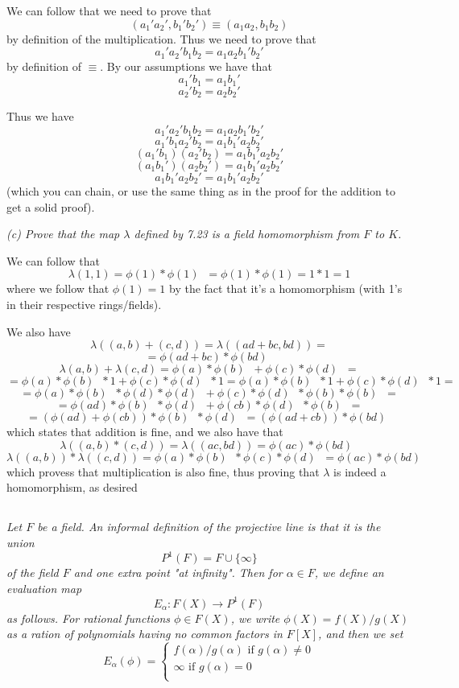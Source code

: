 \documentclass[11pt,oneside,titlepage]{book}
\DeclareMathOperator \inv {^{-1}}
\newcommand{\set}[1]{\{ #1 \}}
\begin{document}
We can follow that we need to prove that
$$(a_1' a_2', b_1' b_2') \equiv (a_1 a_2, b_1 b_2)$$
by definition of the multiplication. Thus we need to prove that
$$a_1' a_2'b_1 b_2 = a_1 a_2 b_1' b_2'$$
by definition of $\equiv$. By our assumptions we have that
$$a_1' b_1 = a_1 b_1'$$
$$a_2' b_2 = a_2 b_2'$$

Thus we have
$$a_1' a_2'b_1 b_2 = a_1 a_2 b_1' b_2'$$
$$a_1' b_1 a_2' b_2  = a_1 b_1' a_2 b_2'$$
$$(a_1' b_1) (a_2' b_2)  = a_1 b_1' a_2 b_2'$$
$$(a_1 b_1') (a_2 b_2')  = a_1 b_1' a_2 b_2'$$
$$a_1 b_1' a_2 b_2'  = a_1 b_1' a_2 b_2'$$
(which you can chain, or use the same thing as in the proof for the
addition to get a solid proof).

\textit{(c) Prove that the map $\lambda$ defined by 7.23 is a field
  homomorphism from $F$ to $K$.}

We can follow that
$$\lambda(1, 1) = \phi(1) * \phi(1)\inv = \phi(1) * \phi(1) = 1 * 1 = 1$$
where we follow that $\phi(1) = 1$ by the fact that it's a
homomorphism (with 1's in their respective rings/fields).

We also have
$$\lambda((a, b) + (c, d)) = \lambda((ad + bc, bd)) = $$
$$ = \phi(ad + bc) * \phi(bd)\inv$$
$$\lambda(a, b) + \lambda(c, d) = \phi(a) * \phi(b)\inv + \phi(c) * \phi(d)\inv = $$
$$= \phi(a) * \phi(b)\inv * 1 + \phi(c) * \phi(d)\inv * 1 =
\phi(a) * \phi(b)\inv * 1 + \phi(c) * \phi(d)\inv * 1 = $$
$$ =
\phi(a) * \phi(b)\inv * \phi(d) * \phi(d)\inv +
\phi(c) * \phi(d)\inv * \phi(b) * \phi(b)\inv = $$
$$ =
\phi(ad) * \phi(b)\inv * \phi(d)\inv +
\phi(cb) * \phi(d)\inv  * \phi(b)\inv = $$
$$=  (\phi(ad) + \phi(cb)) * \phi(b)\inv * \phi(d)\inv =
(\phi(ad + cb)) * \phi(bd)\inv $$
which states that addition is fine, and we also have that
$$\lambda((a, b) * (c, d)) = \lambda((ac, bd))= \phi(ac) * \phi(bd)\inv$$
$$\lambda((a, b)) * \lambda((c, d)) =
\phi(a) * \phi(b)\inv * \phi(c) * \phi(d)\inv = \phi(ac) * \phi(bd)\inv$$
which provess that multiplication is also fine, thus proving that
$\lambda$ is indeed a homomorphism, as desired

\subsection{}

\textit{Let $F$ be a field. An informal definition of the projective
  line is that it is the union
  $$P^1(F) = F \cup \set{\infty}$$
  of the field $F$ and one extra point "at infinity". Then for $\alpha
  \in F$, we define an evaluation map
  $$E_\alpha: F(X) \to P^1(F)$$
  as follows. For rational functions $\phi \in F(X)$, we write
  $\phi(X) = f(X)/g(X)$ as a ration of polynomials having no common
  factors in $F[X]$, and then we set
  $$E_\alpha(\phi) =
  \begin{cases}
    f(\alpha)/g(\alpha) \text{ if } g(\alpha) \neq 0 \\
    \infty \text{ if } g(\alpha) = 0 \\
  \end{cases}
  $$
}
\end{document}
